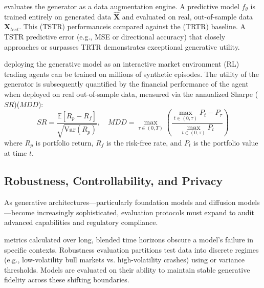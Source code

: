 evaluates the generator as a data augmentation engine. A predictive model $f_\theta$ is trained entirely on generated data $\hat{\mathbf{X}}$ and evaluated on real, out-of-sample data $\mathbf{X}_{test}$. This (TSTR) performanceis compared against the (TRTR) baseline. A TSTR predictive error (e.g., MSE or directional accuracy) that closely approaches or surpasses TRTR demonstrates exceptional generative utility.

deploying the generative model as an interactive market environment (RL) trading agents can be trained on millions of synthetic episodes. The utility of the generator is subsequently quantified by the financial performance of the agent when deployed on real out-of-sample data, measured via the annualized Sharpe ($SR$)($MDD$):
    \begin{equation}
        SR = \frac{\mathbb{E}[R_p - R_f]}{\sqrt{\text{Var}(R_p)}}, \quad MDD = \max_{\tau \in (0, T)} \left( \frac{\max_{t \in (0, \tau)} P_t - P_\tau}{\max_{t \in (0, \tau)} P_t} \right)
    \end{equation}
    where $R_p$ is portfolio return, $R_f$ is the risk-free rate, and $P_t$ is the portfolio value at time $t$.

\subsection{Robustness, Controllability, and Privacy}
As generative architectures—particularly foundation models and diffusion models—become increasingly sophisticated, evaluation protocols must expand to audit advanced capabilities and regulatory compliance.

metrics calculated over long, blended time horizons obscure a model's failure in specific contexts. Robustness evaluation partitions test data into discrete regimes (e.g., low-volatility bull markets vs. high-volatility crashes) using or variance thresholds. Models are evaluated on their ability to maintain stable generative fidelity across these shifting boundaries.

